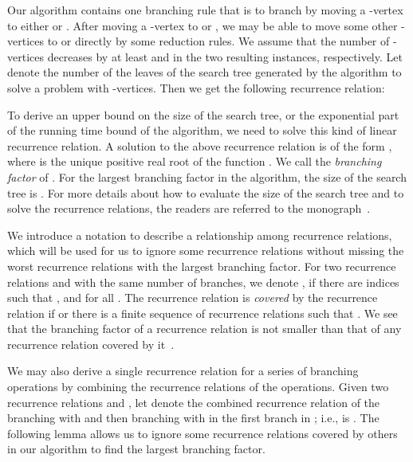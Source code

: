 \documentclass{elsart_TR2}
\begin{document}
Our algorithm contains one branching rule that is to branch by moving a -vertex to either  or .
After  moving a -vertex to  or , we may be able
to move some other -vertices to  or  directly by some reduction rules.
We assume that the number of -vertices decreases by at least  and  in the two resulting instances, respectively. Let  denote the number of the leaves of the search tree generated by the algorithm to solve a problem with  -vertices. Then we get the following recurrence relation:

To derive an upper bound on the size of the search tree, or the exponential part of the running time bound of the algorithm, we need to solve
this kind of linear recurrence relation.
A solution to the above recurrence relation is of the form , where  is the unique positive real root of the function .
We call  the \emph{branching factor} of .
For the largest branching factor   in the algorithm,
 the size of the search tree is .
For more details about how to  evaluate the size of the search tree and to solve the recurrence relations,
the readers are referred to the monograph~\cite{Fomin:book}.




We introduce a notation to describe a relationship among  recurrence relations, which will be used for us to ignore some recurrence relations without missing the worst recurrence relations with the largest branching factor.
 For two  recurrence relations
 and
 with the same number  of branches,
we denote ,
if
there are indices  such that ,  and  for
all .
The recurrence relation  is \emph{covered} by the recurrence relation  if  or there is a finite sequence of recurrence relations
 such that
.
We see that the branching factor of a recurrence relation is not smaller than that of any recurrence relation covered by it~\cite{Fomin:book}.

We may also derive a single recurrence relation for a series of branching operations
by combining the recurrence relations of the operations.
Given two recurrence relations
 and
,
let   denote
the combined recurrence relation of the branching with  and then
branching with  in the first branch in ;
 i.e.,  is .
The following lemma allows us to ignore some recurrence relations covered
by others in our algorithm to find the largest branching factor.

\end{document}
